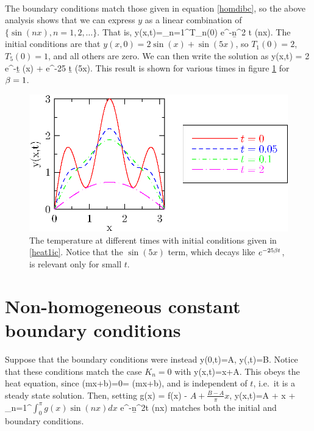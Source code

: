 \documentclass[12pt]{book}
\begin{document}
\\
{
  The boundary conditions match those given in equation \eqref{homdibc}, so
  the above analysis shows that we can express $y$ as a linear combination
  of $\{\sin(nx),n=1,2,\dots\}$. That is,
  \bee
  y(x,t)=\sum_{n=1}^\infty T_n(0) e^{-\b n^2 t} \sin(nx).
  \eee
  The initial conditions are that $y(x,0)=2\sin(x)+\sin(5x)$, so $T_1(0)=2$,
  $T_5(0)=1$, and all others are zero. We can then write the solution as
  \bee
  y(x,t) = 2 e^{-\b t} \sin(x) + e^{-25 \b t} \sin(5x).
  \eee
 This result is shown for various times in figure \ref{heat1} for $\beta=1$.
  \begin{figure}[htbp]
    \begin{center}
      \includegraphics{201/heat1}
      \caption{The temperature at different times with initial conditions
        given in \eqref{heat1ic}. Notice that the $\sin(5x)$ term, which 
        decays like $e^{-25 \beta t}$, is relevant only for small $t$. }
      \label{heat1}
    \end{center}
  \end{figure}
}


\section{Non-homogeneous constant boundary conditions}

Suppose that the boundary conditions were instead
\bee
y(0,t)=A, \qquad y(\pi,t)=B.
\eee
Notice that these conditions match the case $K_n=0$ with
\bee
y(x,t)=x+A.
\eee
This obeys the heat equation, since 
\bee
{}(mx+b)=0= (mx+b),
\eee
and is independent of $t$, i.e.\ it is a steady state solution. Then, setting
\bee
g(x) = f(x) - \(A+ \frac{B-A}{\pi}x\),
\eee
\be
\label{diribc}
y(x,t)=A + x +
\sum_{n=1}^\infty\(\int_{0}^\pi g(x)\sin(nx)dx\) e^{-\b n^2t} \sin(nx)
\ee
matches both the initial and boundary conditions.
\end{document}
